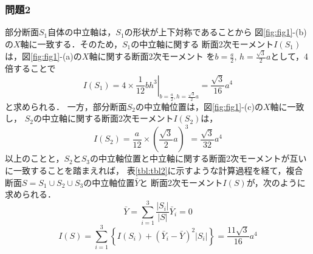 \documentclass[10pt,a4j]{jarticle}
\begin{document}
\subsubsection*{問題2}
部分断面$S_1$自体の中立軸は，$S_1$の形状が上下対称であることから
図\ref{fig:fig1}-(b)の$X$軸に一致する．そのため，$S_1$の中立軸に関する
断面2次モーメント$I(S_1)$は，図\ref{fig:fig1}-(a)の$X$軸に関する断面2次モーメント
を$b=\frac{a}{2},\,h=\frac{\sqrt{3}}{2}a$として，4倍することで
\begin{equation}
	I(S_1) =  4\times \left. \frac{1}{12}bh^3 \right|_{b=\frac{a}{2},h=\frac{\sqrt{3}}{2}a}=\frac{\sqrt{3}}{16}a^4
	\label{eqn:eq_lbl}
\end{equation}
と求められる．
一方，部分断面$S_2$の中立軸位置は，図\ref{fig:fig1}-(c)の$X$軸に一致し，
$S_2$の中立軸に関する断面2次モーメント$I(S_2)$は，
\begin{equation}
	I(S_2)= 
		\frac{a}{12} \times \left( \frac{\sqrt{3}}{2}a \right)^3=\frac{\sqrt{3}}{32}a^4
	\label{eqn:eq_lbl}
\end{equation}
以上のことと，$S_2$と$S_3$の中立軸位置と中立軸に関する断面2次モーメントが互いに一致することを踏まえれば，
表\ref{tbl:tbl2}に示すような計算過程を経て，複合断面$S=S_1\cup S_2 \cup S_3$の中立軸位置$\bar Y$と
断面2次モーメント$I(S)$が，次のように求められる．
\begin{equation}
	\bar Y = \sum_{i=1}^3 \frac{\left|S_i\right|}{\left| S \right|}\bar{Y}_i=0
	\label{eqn:Yb2}
\end{equation}
\begin{equation}
	I(S)=\sum_{i=1}^3\left\{
		I(S_i)+\left( \bar Y_i -\bar Y\right)^2\left| S_i \right|
	\right\}
		=\frac{11\sqrt{3}}{16}a^4
	\label{eqn:Iz_2}
\end{equation}
\end{document}
